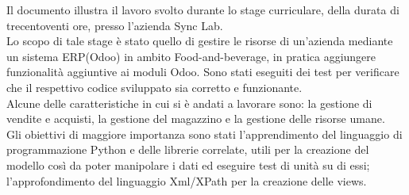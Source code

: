 
Il documento illustra il lavoro svolto durante lo stage curriculare, della durata di trecentoventi ore, presso l’azienda Sync Lab.\\
Lo scopo di tale stage è stato quello di gestire le risorse di un'azienda mediante un sistema ERP(Odoo) in ambito Food-and-beverage, in pratica aggiungere funzionalità aggiuntive ai moduli Odoo.
Sono stati eseguiti dei test per verificare che il respettivo codice sviluppato sia corretto e funzionante.\\
Alcune delle caratteristiche in cui si è andati a lavorare sono: la gestione di vendite e acquisti, la gestione del magazzino e la gestione delle risorse umane.
\newline
\\
Gli obiettivi di maggiore importanza sono stati l'apprendimento del linguaggio di programmazione Python e delle librerie correlate, utili per la creazione del modello così da poter manipolare i dati ed eseguire test di unità su di essi; l'approfondimento del linguaggio Xml/XPath per la creazione delle views.